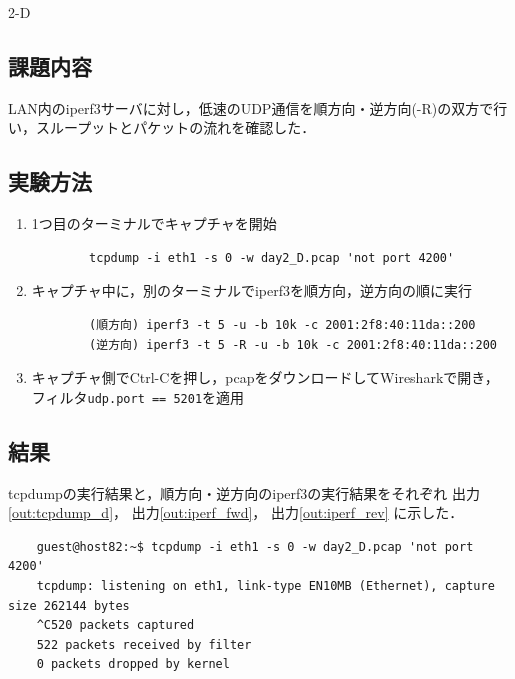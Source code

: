 \begin{maintask}{2-D}
  \subsection*{課題内容}
  LAN内のiperf3サーバに対し，低速のUDP通信を順方向・逆方向(-R)の双方で行い，スループットとパケットの流れを確認した．

  \subsection*{実験方法}
  \begin{enumerate}
    \item 1つ目のターミナルでキャプチャを開始
      \begin{verbatim}
        tcpdump -i eth1 -s 0 -w day2_D.pcap 'not port 4200'
      \end{verbatim}

    \item キャプチャ中に，別のターミナルでiperf3を順方向，逆方向の順に実行
      \begin{verbatim}
        (順方向) iperf3 -t 5 -u -b 10k -c 2001:2f8:40:11da::200
        (逆方向) iperf3 -t 5 -R -u -b 10k -c 2001:2f8:40:11da::200
      \end{verbatim}

    \item キャプチャ側でCtrl-Cを押し，pcapをダウンロードしてWiresharkで開き，フィルタ\texttt{udp.port == 5201}を適用
  \end{enumerate}

  \subsection*{結果}
  tcpdumpの実行結果と，順方向・逆方向のiperf3の実行結果をそれぞれ
  出力\ref{out:tcpdump_d}，
  出力\ref{out:iperf_fwd}，
  出力\ref{out:iperf_rev}
  に示した．

  \begin{termout}[H]
    \caption{tcpdump の実行結果}\label{out:tcpdump_d}
    \begin{verbatim}
    guest@host82:~$ tcpdump -i eth1 -s 0 -w day2_D.pcap 'not port 4200'                                      
    tcpdump: listening on eth1, link-type EN10MB (Ethernet), capture size 262144 bytes                       
    ^C520 packets captured                                                                                   
    522 packets received by filter                                                                           
    0 packets dropped by kernel  
    \end{verbatim}
  \end{termout}


\end{maintask}
